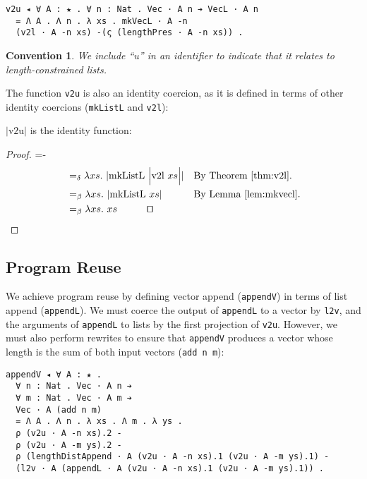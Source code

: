 \documentclass[a4paper,envcountsame,envcountsect]{llncs}
\newtheorem{convention}{Convention}
\newcommand{\eqed}[0]{\tag*{\qed}}
\newcommand{\refthm}[1]{Theorem \ref{thm:#1}}
\newcommand{\labthm}[1]{\label{thm:#1}}
\newcommand{\reflem}[1]{Lemma \ref{lem:#1}}
\newcommand{\earg}[1]{\,\,#1}
\newcommand{\erase}[1]{\ensuremath{\lvert #1 \rvert}}
\newcommand{\Erase}[1]{\ensuremath{\Big\lvert #1 \Big\rvert}}
\newcommand{\fun}[1]{\lambda #1 .~}
\newcommand{\by}[1]{\text{#1}}
\newcommand{\name}[1]{\textrm{#1}}
\begin{document}
\begin{verbatim}
v2u ◂ ∀ A : ★ . ∀ n : Nat . Vec · A n ➔ VecL · A n
  = Λ A . Λ n . λ xs . mkVecL · A -n
  (v2l · A -n xs) -(ς (lengthPres · A -n xs)) .
\end{verbatim}

\begin{convention}
We include ``u'' in an identifier
to indicate that it relates to length-constrained lists.
\end{convention}

The function \texttt{v2u} is also an identity coercion, as it is
defined in terms of other identity coercions (\texttt{mkListL} and
\texttt{v2l}):

\begin{theorem}
\erase{\name{v2u}} is the identity function:
\labthm{v2u}
\end{theorem}

\begin{proof}
{\small
\abovedisplayskip=-\baselineskip
\begin{align*}
  &=_\delta \fun{xs} \erase{
    \name{mkListL} \earg
    \Erase{\name{v2l} \earg xs}
  }
  && \by{By \refthm{v2l}.}
  \\
  &=_\beta \fun{xs} \erase{
    \name{mkListL} \earg xs
  }
  && \by{By \reflem{mkvecl}.}
  \\
  &=_\beta \fun{xs}{xs}
  \eqed
\end{align*}}
\end{proof}


\subsection{Program Reuse}

We achieve program reuse by defining vector append
(\texttt{appendV}) in terms of list append (\texttt{appendL}). We must
coerce the output of \texttt{appendL} to a vector by \texttt{l2v},
and the arguments of \texttt{appendL} to lists by the first
projection of \texttt{v2u}. However, we must also perform rewrites to
ensure that \texttt{appendV} produces a vector whose length is the sum
of both input vectors (\texttt{add n m}):

\begin{verbatim}
appendV ◂ ∀ A : ★ .
  ∀ n : Nat . Vec · A n ➔
  ∀ m : Nat . Vec · A m ➔
  Vec · A (add n m)
  = Λ A . Λ n . λ xs . Λ m . λ ys .
  ρ (v2u · A -n xs).2 - 
  ρ (v2u · A -m ys).2 -
  ρ (lengthDistAppend · A (v2u · A -n xs).1 (v2u · A -m ys).1) -
  (l2v · A (appendL · A (v2u · A -n xs).1 (v2u · A -m ys).1)) .
\end{verbatim}
\end{document}
